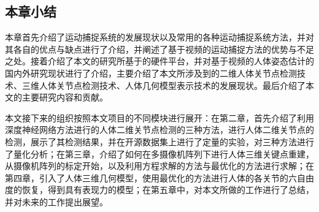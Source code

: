 \subsection{本章小结}
本章首先介绍了运动捕捉系统的发展现状以及常用的各种运动捕捉系统方法，并对其各自的优点与缺点进行了介绍，并阐述了基于视频的运动捕捉方法的优势与不足之处。接着介绍了本文的研究所基于的硬件平台，并对基于视频的人体姿态估计的国内外研究现状进行了介绍，主要介绍了本文所涉及到的二维人体关节点检测技术、三维人体关节点检测技术、人体几何模型表示技术的发展现状。最后介绍了本文的主要研究内容和贡献。

本文接下来的组织按照本文项目的不同模块进行展开：在第二章，首先介绍了利用深度神经网络方法进行的人体二维关节点检测的三种方法，进行人体二维关节点的检测，展示了其检测结果，并在开源数据集上进行了定量的实验，对三种方法进行了量化分析；在第三章，介绍了如何在多摄像机阵列下进行人体三维关键点重建，从摄像机阵列的标定开始，以及利用方程求解的方法与最优化的方法进行求解；在第四章，引入了人体三维几何模型，使用最优化的方法进行人体的各关节的六自由度的恢复，得到具有表现力的模型；在第五章中，对本文所做的工作进行了总结，并对未来的工作提出展望。
